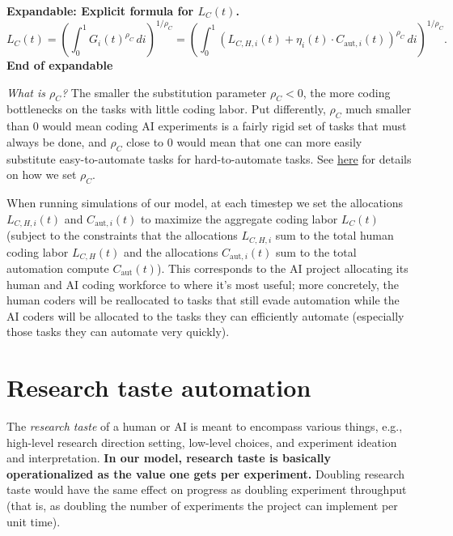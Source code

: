 \documentclass{article}
\theoremstyle{definition}
\newcommand{\ESUG}[1]{\textcolor{purple}{ELI-SUGGESTION: #1}}
\newcommand{\ASUG}[1]{\textcolor{magenta}{ALEX-SUGGESTION: #1}}
\begin{document}
\textbf{Expandable: Explicit formula for $L_C(t)$.}
\[ L_C(t) = \left( \int_0^1 G_i(t)^{\rho_C} \, di \right)^{1/\rho_C} = \left(\int_0^1 (L_{C,H,i}(t) + \eta_i(t) \cdot C_{\text{aut}, i}(t))^{\rho_C} \, di \right)^{1/\rho_C}.\]
\textbf{End of expandable}

\textit{What is $\rho_C$?} The smaller the substitution parameter $\rho_C < 0$, the more coding bottlenecks on the tasks with little coding labor. Put differently, $\rho_C$ much smaller than 0 would mean coding AI experiments is a fairly rigid set of tasks that must always be done, and $\rho_C$ close to 0 would mean that one can more easily substitute easy-to-automate tasks for hard-to-automate tasks. See \href{https://docs.google.com/document/d/1ru6Okbxb6XuH18Cz8439sdQJazMV39hNxsWDokh97r0/edit?tab=t.0#bookmark=kix.z267tw4qht29}{here} for details on how we set $\rho_C$. %

When running simulations of our model, at each timestep we set the allocations $L_{C,H,i}(t)$ and $C_{\text{aut},i}(t)$ to maximize the aggregate coding labor $L_C(t)$ (subject to the constraints that the allocations $L_{C,H,i}$ sum to the total human coding labor $L_{C,H}(t)$ and the allocations $C_{\text{aut},i}(t)$ sum to the total automation compute $C_{\text{aut}}(t)$). This corresponds to the AI project allocating its human and AI coding workforce to where it's most useful; more concretely, the human coders will be reallocated to tasks that still evade automation while the AI coders will be allocated to the tasks they can efficiently automate (especially those tasks they can automate very quickly).

\section{Research taste automation}\label{Research taste automation}

The \textit{research taste} of a human or AI is meant to encompass various things, e.g., high-level research direction setting, low-level choices, and experiment ideation and interpretation. \textbf{In our model, research taste is basically operationalized as the value one gets per experiment.} Doubling research taste would have the same effect on progress as doubling experiment throughput (that is, as doubling the number of experiments the project can implement per unit time).
\end{document}
